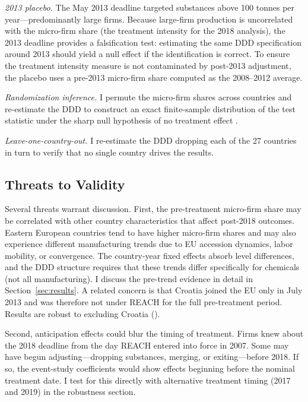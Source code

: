 \documentclass[12pt]{article}
\begin{document}
\textit{2013 placebo.} The May 2013 deadline targeted substances above 100 tonnes per year---predominantly large firms. Because large-firm production is uncorrelated with the micro-firm share (the treatment intensity for the 2018 analysis), the 2013 deadline provides a falsification test: estimating the same DDD specification around 2013 should yield a null effect if the identification is correct. To ensure the treatment intensity measure is not contaminated by post-2013 adjustment, the placebo uses a pre-2013 micro-firm share computed as the 2008--2012 average.

\textit{Randomization inference.} I permute the micro-firm shares across countries and re-estimate the DDD to construct an exact finite-sample distribution of the test statistic under the sharp null hypothesis of no treatment effect \citep{fisher1935}.

\textit{Leave-one-country-out.} I re-estimate the DDD dropping each of the 27 countries in turn to verify that no single country drives the results.

\subsection{Threats to Validity}

Several threats warrant discussion. First, the pre-treatment micro-firm share may be correlated with other country characteristics that affect post-2018 outcomes. Eastern European countries tend to have higher micro-firm shares and may also experience different manufacturing trends due to EU accession dynamics, labor mobility, or convergence. The country-year fixed effects absorb level differences, and the DDD structure requires that these trends differ specifically for chemicals (not all manufacturing). I discuss the pre-trend evidence in detail in Section~\ref{sec:results}. A related concern is that Croatia joined the EU only in July 2013 and was therefore not under REACH for the full pre-treatment period. Results are robust to excluding Croatia ().

Second, anticipation effects could blur the timing of treatment. Firms knew about the 2018 deadline from the day REACH entered into force in 2007. Some may have begun adjusting---dropping substances, merging, or exiting---before 2018. If so, the event-study coefficients would show effects beginning before the nominal treatment date. I test for this directly with alternative treatment timing (2017 and 2019) in the robustness section.
\end{document}
